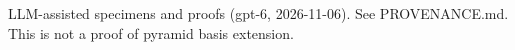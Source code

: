 \documentclass[11pt]{article}
\begin{document}

\bigskip
{\footnotesize LLM-assisted specimens and proofs (gpt-6, 2026-11-06).
See PROVENANCE.md. This is not a proof of pyramid basis extension.}
\end{document}
